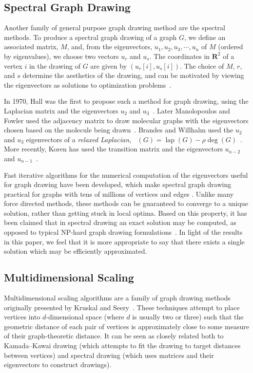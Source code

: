 \documentclass[oribibl,10pt]{llncs}
\newcommand{\reals}{\mathbf{R}}
\DeclareMathOperator{\degree}{deg}
\DeclareMathOperator{\laplacian}{lap}
\DeclareMathOperator{\rlaplacian}{lap_\rho}
\begin{document}
\begin{appendix}
\subsection{Spectral Graph Drawing}
Another family of general purpose graph drawing method are the spectral methods. 
To produce a spectral graph drawing of a graph $G$, we define an 
associated matrix, $M$, and, from the eigenvectors,
$u_1, u_2, u_3, \cdots, u_n$ of $M$ (ordered by eigenvalues), we choose two vectors $u_r$ and $u_s$. The coordinates in $\reals^2$ of a vertex $i$ in the drawing of $G$ are given by $(u_r[i], u_s[i])$. The choice of $M$, $r$, and $s$ determine the aesthetics of the drawing, and can be motivated by viewing the eigenvectors as solutions to optimization problems~\cite{Kor-CMA-2005}.

In 1970, Hall was the first to propose such a method for graph drawing, using the Laplacian matrix and the eigenvectors $u_2$ and $u_3$~. Later Manolopoulos and Fowler used the adjacency matrix to draw molecular graphs with the eigenvectors chosen based on the molecule being drawn~. Brandes and Willhalm used the $u_2$ and $u_3$ eigenvectors of a \emph{relaxed Laplacian}, $\rlaplacian(G) = \laplacian(G) - \rho\degree(G)$~. More recently, Koren has used the transition matrix and the eigenvectors $u_{n-2}$ and $u_{n-1}$~\cite{Kor-CMA-2005}.

Fast iterative algorithms for the numerical computation of the eigenvectors useful for graph drawing have been developed, which make spectral graph drawing practical for graphs with tens of millions of vertices and edges \cite{Kor-CMA-2005} . Unlike many force directed methods, these methods can be guaranteed to converge to a unique solution, rather than getting stuck in local optima. Based on this property, it has been claimed that in spectral drawing an exact solution may be computed, as opposed to typical NP-hard graph drawing formulations~\cite{Kor-CMA-2005}. In light of the results in this paper, we feel that it is more appropriate to say that there exists a single solution which may be efficiently approximated. 

\subsection{Multidimensional Scaling}

Multidimensional scaling algorithms are a family of graph drawing methods originally presented by Kruskal and Seery~\cite{KruSee-CSG-80}.  These techniques attempt to place vertices into $d$-dimensional space (where $d$ is usually two or three) such that the geometric distance of each pair of vertices is approximately close to some measure of their graph-theoretic distance. 
It can be seen as closely related both to Kamada--Kawai drawing (which attempts to fit the drawing to target distances between vertices) and spectral drawing (which uses matrices and their eigenvectors to construct drawings).


\end{appendix}
\end{document}
